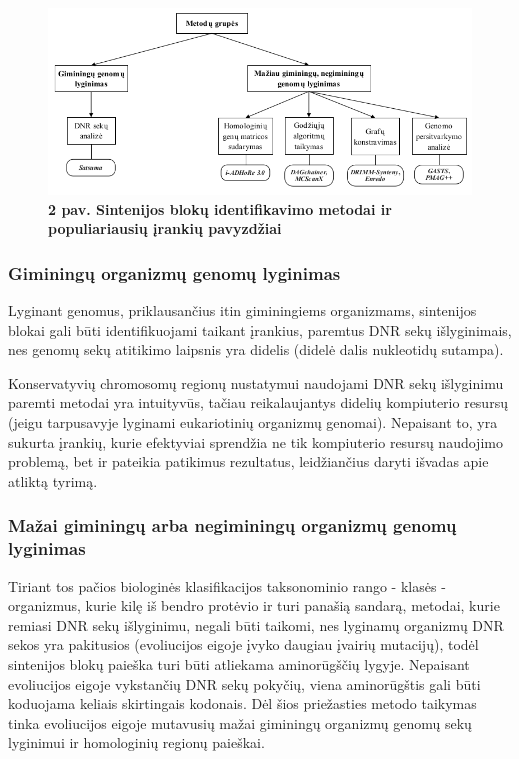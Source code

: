 \documentclass[12pt]{article}
\begin{document}
\begin{figure}[htb]
    \begin{center}
        \includegraphics[width=0.9\linewidth]{../Figures/Methods_tools.png}
        \vspace{-2\baselineskip}
        \caption*{\small\textbf{2 pav. Sintenijos blokų identifikavimo
                                metodai ir populiariausių įrankių pavyzdžiai}}
        \label{fig:2}
    \end{center}
\end{figure}

\subsubsection{Giminingų organizmų genomų lyginimas}
Lyginant genomus, priklausančius itin giminingiems organizmams, sintenijos
blokai gali būti identifikuojami taikant įrankius, paremtus DNR sekų
išlyginimais, nes genomų sekų atitikimo laipsnis yra didelis (didelė dalis
nukleotidų sutampa)\cite{ARTICLE3}.

Konservatyvių chromosomų regionų nustatymui naudojami DNR sekų išlyginimu
paremti metodai yra intuityvūs, tačiau reikalaujantys didelių kompiuterio
resursų (jeigu tarpusavyje lyginami eukariotinių organizmų genomai). Nepaisant
to, yra sukurta įrankių, kurie efektyviai sprendžia ne tik kompiuterio resursų
naudojimo problemą, bet ir pateikia patikimus rezultatus, leidžiančius daryti
išvadas apie atliktą tyrimą\cite{SYNCHRO}.

\subsubsection{Mažai giminingų arba negiminingų organizmų genomų lyginimas}
Tiriant tos pačios biologinės klasifikacijos taksonominio rango - klasės -
organizmus, kurie kilę iš bendro protėvio ir turi panašią sandarą, metodai, 
kurie remiasi DNR sekų išlyginimu, negali būti taikomi, nes lyginamų organizmų
DNR sekos yra pakitusios (evoliucijos eigoje įvyko daugiau įvairių mutacijų),
todėl sintenijos blokų paieška turi būti atliekama aminorūgščių
lygyje\cite{ARTICLE4}.
Nepaisant evoliucijos eigoje vykstančių DNR sekų pokyčių, viena aminorūgštis
gali būti koduojama keliais skirtingais kodonais. Dėl šios priežasties metodo
taikymas tinka evoliucijos eigoje mutavusių mažai giminingų organizmų genomų
sekų lyginimui ir homologinių regionų paieškai.
\end{document}
